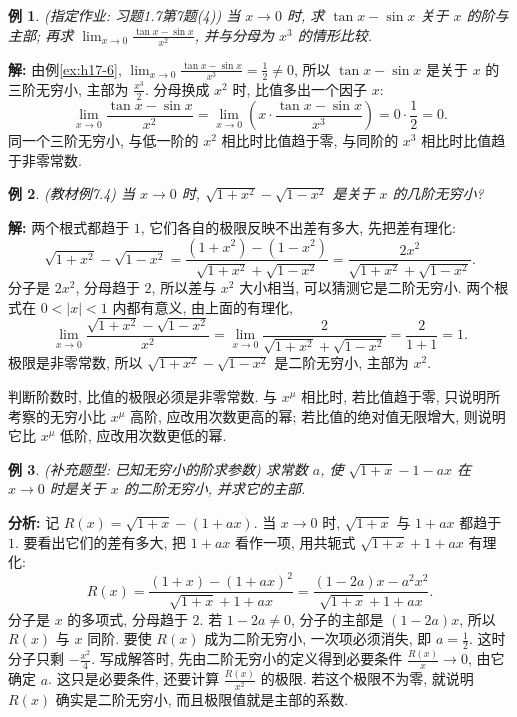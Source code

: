 \documentclass[UTF8,openany]{ctexbook}
\theoremstyle{chinesetextbook}
\newtheorem{example}{例}[section]
\newenvironment{cnsolution}{\par\indent\textbf{解:} \ignorespaces}{\par}
\begin{document}
\begin{example}
\textnormal{(指定作业: 习题1.7第7题(4))} 当 $x\to0$ 时, 求 $\tan x-\sin x$ 关于 $x$ 的阶与主部; 再求 $\displaystyle\lim_{x\to0}\frac{\tan x-\sin x}{x^2}$, 并与分母为 $x^3$ 的情形比较.
\end{example}
\begin{cnsolution}
由例\ref{ex:h17-6}, $\displaystyle\lim_{x\to0}\frac{\tan x-\sin x}{x^3}=\frac12\ne0$, 所以 $\tan x-\sin x$ 是关于 $x$ 的三阶无穷小, 主部为 $\displaystyle\frac{x^3}2$. 分母换成 $x^2$ 时, 比值多出一个因子 $x$:
\[
\lim_{x\to0}\frac{\tan x-\sin x}{x^2}=\lim_{x\to0}\left(x\cdot\frac{\tan x-\sin x}{x^3}\right)=0\cdot\frac12=0.
\]
同一个三阶无穷小, 与低一阶的 $x^2$ 相比时比值趋于零, 与同阶的 $x^3$ 相比时比值趋于非零常数.
\end{cnsolution}
\begin{example}
\textnormal{(教材例7.4)} 当 $x\to0$ 时, $\sqrt{1+x^2}-\sqrt{1-x^2}$ 是关于 $x$ 的几阶无穷小?
\end{example}
\begin{cnsolution}
两个根式都趋于 $1$, 它们各自的极限反映不出差有多大, 先把差有理化:
\[
\sqrt{1+x^2}-\sqrt{1-x^2}=\frac{(1+x^2)-(1-x^2)}{\sqrt{1+x^2}+\sqrt{1-x^2}}=\frac{2x^2}{\sqrt{1+x^2}+\sqrt{1-x^2}}.
\]
分子是 $2x^2$, 分母趋于 $2$, 所以差与 $x^2$ 大小相当, 可以猜测它是二阶无穷小. 两个根式在 $0<|x|<1$ 内都有意义, 由上面的有理化,
\[
\lim_{x\to0}\frac{\sqrt{1+x^2}-\sqrt{1-x^2}}{x^2}=\lim_{x\to0}\frac2{\sqrt{1+x^2}+\sqrt{1-x^2}}=\frac2{1+1}=1.
\]
极限是非零常数, 所以 $\sqrt{1+x^2}-\sqrt{1-x^2}$ 是二阶无穷小, 主部为 $x^2$.
\end{cnsolution}
判断阶数时, 比值的极限必须是非零常数. 与 $x^\mu$ 相比时, 若比值趋于零, 只说明所考察的无穷小比 $x^\mu$ 高阶, 应改用次数更高的幂; 若比值的绝对值无限增大, 则说明它比 $x^\mu$ 低阶, 应改用次数更低的幂.
\begin{example}
\textnormal{(补充题型: 已知无穷小的阶求参数)} 求常数 $a$, 使 $\sqrt{1+x}-1-ax$ 在 $x\to0$ 时是关于 $x$ 的二阶无穷小, 并求它的主部.
\end{example}
\par\indent\textbf{分析:} 记 $R(x)=\sqrt{1+x}-(1+ax)$. 当 $x\to0$ 时, $\sqrt{1+x}$ 与 $1+ax$ 都趋于 $1$. 要看出它们的差有多大, 把 $1+ax$ 看作一项, 用共轭式 $\sqrt{1+x}+1+ax$ 有理化:
\[
R(x)=\frac{(1+x)-(1+ax)^2}{\sqrt{1+x}+1+ax}=\frac{(1-2a)x-a^2x^2}{\sqrt{1+x}+1+ax}.
\]
分子是 $x$ 的多项式, 分母趋于 $2$. 若 $1-2a\ne0$, 分子的主部是 $(1-2a)x$, 所以 $R(x)$ 与 $x$ 同阶. 要使 $R(x)$ 成为二阶无穷小, 一次项必须消失, 即 $\displaystyle a=\frac12$. 这时分子只剩 $\displaystyle-\frac{x^2}4$. 写成解答时, 先由二阶无穷小的定义得到必要条件 $\displaystyle\frac{R(x)}x\to0$, 由它确定 $a$. 这只是必要条件, 还要计算 $\displaystyle\frac{R(x)}{x^2}$ 的极限. 若这个极限不为零, 就说明 $R(x)$ 确实是二阶无穷小, 而且极限值就是主部的系数.
\end{document}
